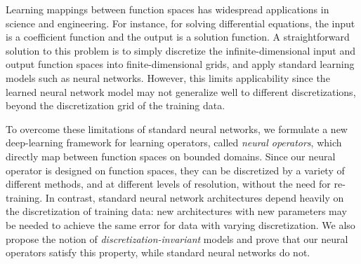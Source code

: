 

Learning mappings between  function spaces has widespread applications  in science and engineering. For instance, for  solving differential equations,  the input is a coefficient function and the output is a solution function. A straightforward solution to this problem  is to simply  discretize the infinite-dimensional input and output function spaces into finite-dimensional grids, and apply standard learning models such as 
neural networks. However, this limits  applicability since the learned  neural network model may not  generalize well to different discretizations, beyond the discretization grid of the training data.

To overcome these limitations of standard neural networks, we  formulate a new deep-learning framework for learning operators, called {\em neural operators}, which directly map between  function spaces on bounded domains.  Since our neural operator is  designed on function spaces, they
can be discretized by a variety of different methods, and at different levels of resolution, without the need for re-training. In contrast, standard neural network architectures depend heavily on the discretization of training data: new architectures with new parameters may be needed to achieve the same error for   data with varying discretization.  We also propose the notion of {\em discretization-invariant} models and prove that our neural operators satisfy this property, while standard neural networks do not. 


